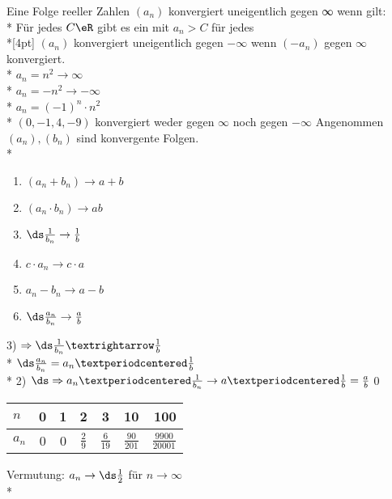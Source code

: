 %
%
\wdh
Eine Folge reeller Zahlen $(a_n)$ konvergiert uneigentlich gegen ∞ wenn gilt:\\*
Für jedes $C\eR$ gibt es ein \nN{} mit $a_n > C$ für jedes \nN\\*[4pt]
$(a_n)$ konvergiert uneigentlich gegen $- ∞$ wenn $(-a_n)$ gegen $∞$ konvergiert.\\*
%
%
\bsp
$a_n = n^2 \to ∞$\\*
$a_n = -n^2 \to -∞$\\*
$a_n = (-1)^n · n^2$\\*
$(0, -1, 4, -9)$ konvergiert weder gegen $∞$ noch gegen $ - ∞$
%
Angenommen $(a_n), (b_n)$ sind konvergente Folgen.\\*
\begin{enumerate}
\item{$(a_n + b_n) \to a + b$}
\item{$(a_n · b_n) \to ab$}
\item{$\ds\frac{1}{b_n} \to \frac{1}{b}$}
\item{$c · a_n \to c · a$}
\item{$a_n - b_n \to a - b$}
\item{$\ds\frac{a_n}{b_n} \to \frac{a}{b}$}
\end{enumerate}
%
3) $\Rightarrow\ds\frac{1}{b_n}→\frac{1}{b}$\\*
$\ds\frac{a_n}{b_n} = a_n ·\frac{1}{b}$\\*
2) $\ds\Rightarrow a_n · \frac{1}{b_n} \to a ·\frac{1}{b} = \frac{a}{b}$\qed
%
\bsp
\begin{tabular}{l|c|c|c|c|c|r}
$n$   & 0 & 1 & 2 & 3 & 10 & 100\\*\hline
$a_n$ & 0 & 0 & $\frac{2}{9}$ & $\frac{6}{19}$ & $\frac{90}{201}$ & $\frac{9900}{20001}$ \\*
\end{tabular}
\vspace{5mm}
Vermutung: $a_n \to \ds\frac{1}{2}$ für $n \to ∞$\\*
